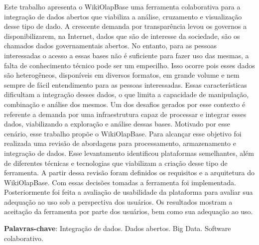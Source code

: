 
\begin{resumo}
   
   Este trabalho apresenta o WikiOlapBase uma ferramenta colaborativa para a integração de 
   dados abertos que viabiliza a análise, cruzamento e visualização desse tipo de dado.
   A crescente demanda por transparência levou os governos a disponibilizarem, na Internet, 
   dados que são de interesse da sociedade, são os chamados dados governamentais abertos. No 
   entanto, para as pessoas interessadas o acesso a essas bases não é suficiente para fazer 
   uso das mesmas, a falta de conhecimento técnico pode ser um empecilho. Isso ocorre pois 
   esses dados são heterogêneos, disponíveis em diversos formatos, em grande volume e nem 
   sempre de fácil entendimento para as pessoas interessadas. Essas características dificultam 
   a integração desses dados, o que limita a capacidade de manipulação, combinação e análise 
   dos mesmos. Um dos desafios gerados por esse contexto é referente a demanda por uma 
   infraestrutura capaz de processar e integrar esses dados, viabilizando a exploração e 
   análise dessas bases. Motivado por esse cenário, esse trabalho propõe o WikiOlapBase. 
   Para alcançar esse objetivo foi realizada uma revisão de abordagens para processamento, 
   armazenamento e integração de dados. Esse levantamento identificou plataformas semelhantes, 
   além de diferentes técnicas e tecnologias que viabilizam a criação desse tipo de ferramenta. 
   A partir dessa revisão foram definidos os requisitos e a arquitetura do WikiOlapBase. Com 
   essas decisões tomadas a ferramenta foi implementada. Posteriormente foi feita a avaliação 
   de usabilidade da plataforma para avaliar sua adequação ao uso sob a perspectiva
   dos usuários. Os resultados mostram a aceitação da ferramenta por parte dos usuários, bem
   como sua adequação ao uso.

    \textbf{Palavras-chave}: Integração de dados. Dados abertos. Big Data. Software colaborativo.
\end{resumo}

